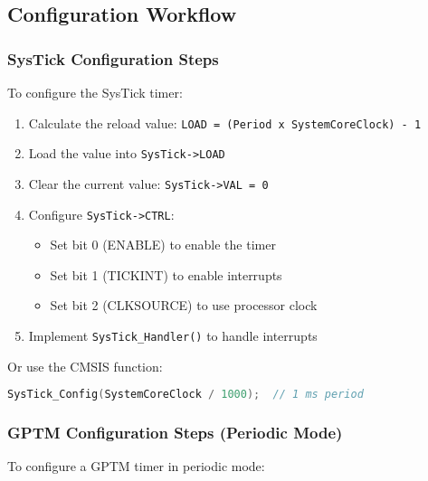 \subsection{Configuration Workflow}

\subsubsection{SysTick Configuration Steps}

To configure the SysTick timer:

\begin{enumerate}[nosep]
  \item Calculate the reload value: \texttt{LOAD = (Period x SystemCoreClock) - 1}
  \item Load the value into \texttt{SysTick->LOAD}
  \item Clear the current value: \texttt{SysTick->VAL = 0}
  \item Configure \texttt{SysTick->CTRL}:
    \begin{itemize}[nosep]
      \item Set bit 0 (ENABLE) to enable the timer
      \item Set bit 1 (TICKINT) to enable interrupts
      \item Set bit 2 (CLKSOURCE) to use processor clock
    \end{itemize}
  \item Implement \texttt{SysTick\_Handler()} to handle interrupts
\end{enumerate}

\noindent
Or use the CMSIS function:
\begin{lstlisting}[language=C]
SysTick_Config(SystemCoreClock / 1000);  // 1 ms period
\end{lstlisting}

\subsubsection{GPTM Configuration Steps (Periodic Mode)}

To configure a GPTM timer in periodic mode:


